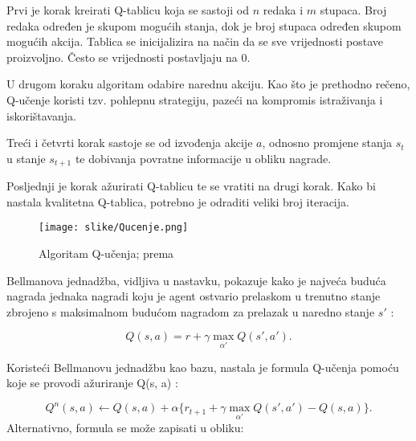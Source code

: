 \documentclass[]{foi} %
\begin{document}
\noindent
\begin{minipage}{0.5\linewidth}
  Prvi je korak kreirati Q-tablicu koja se sastoji od $n$ redaka i $m$ stupaca. Broj redaka određen je skupom mogućih stanja, dok je broj stupaca određen skupom mogućih akcija. Tablica se inicijalizira na način da se sve vrijednosti postave proizvoljno. Često se vrijednosti postavljaju na 0.
  
  U drugom koraku algoritam odabire narednu akciju. Kao što je prethodno rečeno, Q-učenje koristi tzv. pohlepnu strategiju, pazeći na kompromis istraživanja i iskorištavanja.
  
  Treći i četvrti korak sastoje se od izvođenja akcije $a$, odnosno promjene stanja $s_t$ u stanje $s_{t+1}$ te dobivanja povratne informacije u obliku nagrade.
  
  Posljednji je korak ažurirati Q-tablicu te se vratiti na drugi korak. Kako bi nastala kvalitetna Q-tablica, potrebno je odraditi veliki broj iteracija.
\end{minipage}%
\hfill
\begin{minipage}{0.5\linewidth}
  \begin{figure}[H]
    \centering
    \texttt{[image: slike/Qucenje.png]}
    \caption{Algoritam Q-učenja; prema \cite{qucenjeAlgoritam}}
    \label{img: qucenje}
  \end{figure}
\end{minipage}

Bellmanova jednadžba, vidljiva u nastavku, pokazuje kako je najveća buduća nagrada jednaka nagradi koju je agent ostvario prelaskom u trenutno stanje zbrojeno s maksimalnom budućom nagradom za prelazak u naredno stanje $s'$ \cite{bellman}:

\[ Q(s, a) = r + \gamma \max_{\alpha '} Q(s' , a'). \]

Koristeći Bellmanovu jednadžbu kao bazu, nastala je formula Q-učenja pomoću koje se provodi ažuriranje Q(s, a) \cite[str. 75]{AIandGames}: 

\[ Q^n(s, a) \leftarrow Q(s, a) + \alpha \{r_{t+1} + \gamma \max_{\alpha '} Q(s' , a') - Q(s, a)\}. \]
Alternativno, formula se može zapisati u obliku:
\end{document}
